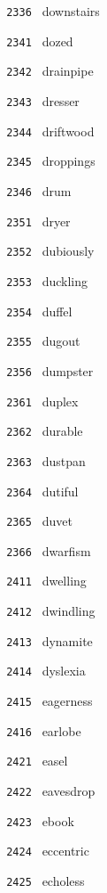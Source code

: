 \documentclass[11pt]{article}
\begin{document}
\begin{multicols}{6}
\noindent \texttt{ 2336 } downstairs  \par
\vspace{3mm}
\noindent \texttt{ 2341 } dozed  \par
\noindent \texttt{ 2342 } drainpipe  \par
\noindent \texttt{ 2343 } dresser  \par
\noindent \texttt{ 2344 } driftwood  \par
\noindent \texttt{ 2345 } droppings  \par
\noindent \texttt{ 2346 } drum  \par
\vspace{3mm}
\noindent \texttt{ 2351 } dryer  \par
\noindent \texttt{ 2352 } dubiously  \par
\noindent \texttt{ 2353 } duckling  \par
\noindent \texttt{ 2354 } duffel  \par
\noindent \texttt{ 2355 } dugout  \par
\noindent \texttt{ 2356 } dumpster  \par
\vspace{3mm}
\noindent \texttt{ 2361 } duplex  \par
\noindent \texttt{ 2362 } durable  \par
\noindent \texttt{ 2363 } dustpan  \par
\noindent \texttt{ 2364 } dutiful  \par
\noindent \texttt{ 2365 } duvet  \par
\noindent \texttt{ 2366 } dwarfism  \par
\noindent \texttt{ 2411 } dwelling  \par
\noindent \texttt{ 2412 } dwindling  \par
\noindent \texttt{ 2413 } dynamite  \par
\noindent \texttt{ 2414 } dyslexia  \par
\noindent \texttt{ 2415 } eagerness  \par
\noindent \texttt{ 2416 } earlobe  \par
\vspace{3mm}
\noindent \texttt{ 2421 } easel  \par
\noindent \texttt{ 2422 } eavesdrop  \par
\noindent \texttt{ 2423 } ebook  \par
\noindent \texttt{ 2424 } eccentric  \par
\noindent \texttt{ 2425 } echoless  \par

\end{multicols}
\end{document}
